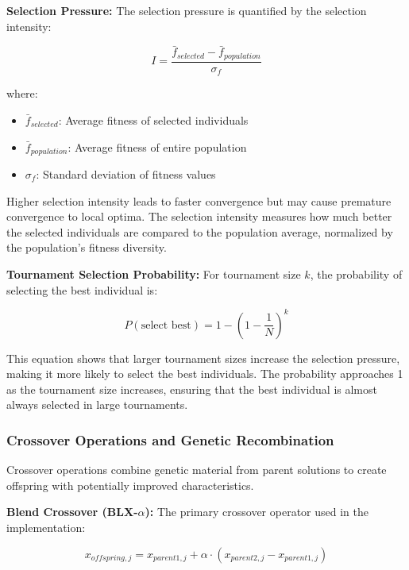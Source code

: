 \documentclass[12pt,a4paper]{article}
\begin{document}
\textbf{Selection Pressure:} The selection pressure is quantified by the selection intensity:

\begin{equation}\label{Eq.selection_intensity}
I = \frac{\bar{f}_{selected} - \bar{f}_{population}}{\sigma_f}
\end{equation}

where:
\begin{itemize}
    \item $\bar{f}_{selected}$: Average fitness of selected individuals
    \item $\bar{f}_{population}$: Average fitness of entire population
    \item $\sigma_f$: Standard deviation of fitness values
\end{itemize}

Higher selection intensity leads to faster convergence but may cause premature convergence to local optima. The selection intensity measures how much better the selected individuals are compared to the population average, normalized by the population's fitness diversity.

\textbf{Tournament Selection Probability:} For tournament size $k$, the probability of selecting the best individual is:

\begin{equation}\label{Eq.tournament_probability}
P(\text{select best}) = 1 - \left(1 - \frac{1}{N}\right)^k
\end{equation}

This equation shows that larger tournament sizes increase the selection pressure, making it more likely to select the best individuals. The probability approaches 1 as the tournament size increases, ensuring that the best individual is almost always selected in large tournaments.

\subsubsection{Crossover Operations and Genetic Recombination}

Crossover operations combine genetic material from parent solutions to create offspring with potentially improved characteristics.

\textbf{Blend Crossover (BLX-$\alpha$):} The primary crossover operator used in the implementation:

\begin{equation}\label{Eq.blend_crossover}
x_{offspring,j} = x_{parent1,j} + \alpha \cdot (x_{parent2,j} - x_{parent1,j})
\end{equation}
\end{document}
